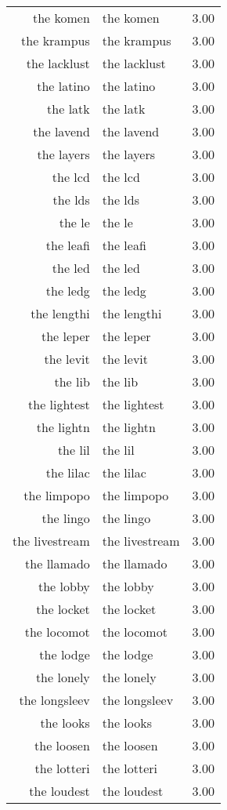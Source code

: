 \begin{table}[ht]
\begin{tabular}{rlr}
  the komen & the komen & 3.00 \\ 
  the krampus & the krampus & 3.00 \\ 
  the lacklust & the lacklust & 3.00 \\ 
  the latino & the latino & 3.00 \\ 
  the latk & the latk & 3.00 \\ 
  the lavend & the lavend & 3.00 \\ 
  the layers & the layers & 3.00 \\ 
  the lcd & the lcd & 3.00 \\ 
  the lds & the lds & 3.00 \\ 
  the le & the le & 3.00 \\ 
  the leafi & the leafi & 3.00 \\ 
  the led & the led & 3.00 \\ 
  the ledg & the ledg & 3.00 \\ 
  the lengthi & the lengthi & 3.00 \\ 
  the leper & the leper & 3.00 \\ 
  the levit & the levit & 3.00 \\ 
  the lib & the lib & 3.00 \\ 
  the lightest & the lightest & 3.00 \\ 
  the lightn & the lightn & 3.00 \\ 
  the lil & the lil & 3.00 \\ 
  the lilac & the lilac & 3.00 \\ 
  the limpopo & the limpopo & 3.00 \\ 
  the lingo & the lingo & 3.00 \\ 
  the livestream & the livestream & 3.00 \\ 
  the llamado & the llamado & 3.00 \\ 
  the lobby & the lobby & 3.00 \\ 
  the locket & the locket & 3.00 \\ 
  the locomot & the locomot & 3.00 \\ 
  the lodge & the lodge & 3.00 \\ 
  the lonely & the lonely & 3.00 \\ 
  the longsleev & the longsleev & 3.00 \\ 
  the looks & the looks & 3.00 \\ 
  the loosen & the loosen & 3.00 \\ 
  the lotteri & the lotteri & 3.00 \\ 
  the loudest & the loudest & 3.00 \\ 

\end{tabular}
\end{table}
